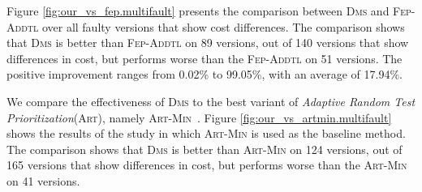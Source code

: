\vspace{0.2cm}
Figure \ref{fig:our_vs_fep.multifault} presents the comparison between \textsc{Dms} and \textsc{Fep-Addtl} over all faulty versions that show cost differences. The comparison shows that \textsc{Dms} is better than \textsc{Fep-Addtl} on 89 versions, out of 140 versions that show differences in cost, 
but performs worse than the \textsc{Fep-Addtl} on 51 versions. The positive improvement ranges from 0.02\% to 99.05\%, with an average of 17.94\%.


\vspace{0.2cm}
We compare the effectiveness of \textsc{Dms} to the best variant of {\em Adaptive Random Test Prioritization}(\textsc{Art}), namely \textsc{Art-Min}~\citep{JiangZCT09, Gonzalez-SanchezPAGG11, Alberto2011}. Figure \ref{fig:our_vs_artmin.multifault} shows the results of the study in which \textsc{Art-Min} is used as the baseline method. The comparison shows that \textsc{Dms} is better than \textsc{Art-Min} on 124 versions, out of 165 versions that show differences in cost, 
but performs worse than the \textsc{Art-Min} on 41 versions.


